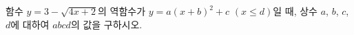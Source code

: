 \hspace*{2mm}\begin{minipage}[t]{\dimexpr\linewidth-2mm\relax}\vspace{0pt}
함수 $y=3-\sqrt{4x+2}$의 역함수가 $y=a(x+b)^2+c$ $(x\le d)$일 때, 상수 $a$, $b$, $c$, $d$에 대하여 $abcd$의 값을 구하시오.\end{minipage}
